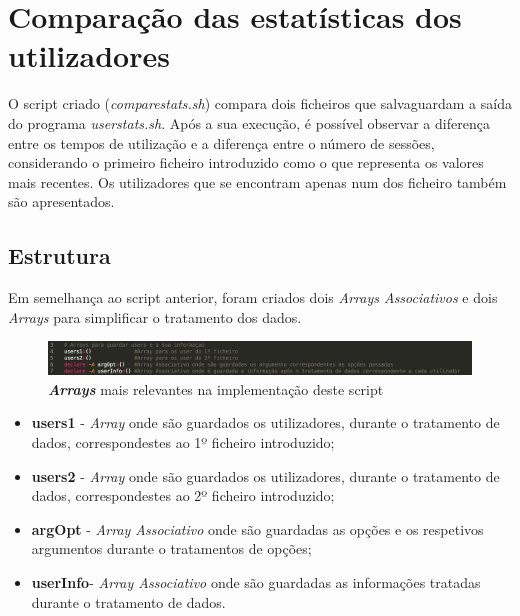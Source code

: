 \documentclass[10pt,portuguese]{article}
\begin{document}
\clearpage
\section{Comparação das estatísticas dos utilizadores}
O script criado (\textit{comparestats.sh}) compara dois ficheiros que salvaguardam a saída do programa \textit{userstats.sh}. Após a sua execução, é possível observar a diferença entre os tempos de utilização e a diferença entre o número de sessões, considerando o primeiro ficheiro introduzido como o que representa os valores mais recentes. Os utilizadores que se encontram apenas num dos ficheiro também são apresentados.
\subsection{Estrutura}
\par Em semelhança ao script anterior, foram criados dois \textit{Arrays Associativos} e dois \textit{Arrays} para simplificar o tratamento dos dados.

\begin{figure}[!h]
    \centering
    \includegraphics[width=\textwidth]{comparestats/estrutura_c.png}
    \caption{\textbf{\textit{Arrays}} mais relevantes na implementação deste script}
\end{figure}
\newline
 \begin{itemize}
   \item {\textbf{users1}}   - \textit{Array} onde são guardados os utilizadores, durante o tratamento de dados, correspondestes ao 1º ficheiro introduzido;
   \\
   \item {\textbf{users2}}   - \textit{Array} onde são guardados os utilizadores, durante o tratamento de dados, correspondestes ao 2º ficheiro introduzido;
   \\
   \item {\textbf{argOpt}}  - \textit{Array Associativo} onde são guardadas as opções e os respetivos argumentos durante o tratamentos de opções;
   \\
   \item {\textbf{userInfo}}- \textit{Array Associativo} onde são guardadas as informações tratadas durante o tratamento de dados.
 \end{itemize}
\clearpage
\end{document}

